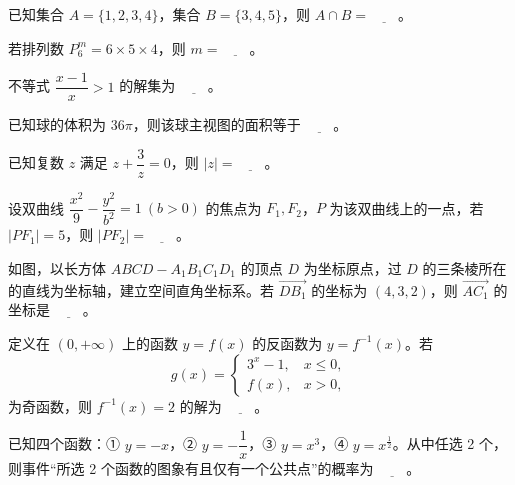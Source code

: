 \begin{question}
已知集合 $A=\{1,2,3,4\}$，集合 $B=\{3,4,5\}$，则 $A\cap B=\underline{\qquad}$。

\end{question}
\begin{question}
若排列数 $P_6^m=6\times5\times4$，则 $m=\underline{\qquad}$。

\end{question}
\begin{question}
不等式 $\dfrac{x-1}{x}>1$ 的解集为 $\underline{\qquad}$。

\end{question}
\begin{question}
已知球的体积为 $36\pi$，则该球主视图的面积等于 $\underline{\qquad}$。

\end{question}
\begin{question}
已知复数 $z$ 满足 $z+\dfrac{3}{z}=0$，则 $|z|=\underline{\qquad}$。

\end{question}
\begin{question}
设双曲线 $\dfrac{x^2}{9}-\dfrac{y^2}{b^2}=1\ (b>0)$ 的焦点为 $F_1,F_2$，$P$ 为该双曲线上的一点，若 $|PF_1|=5$，则 $|PF_2|=\underline{\qquad}$。

\Needspace{0.4\textheight}
\end{question}
\begin{question}
如图，以长方体 $ABCD-A_1B_1C_1D_1$ 的顶点 $D$ 为坐标原点，过 $D$ 的三条棱所在的直线为坐标轴，建立空间直角坐标系。若 $\overrightarrow{DB_1}$ 的坐标为 $(4,3,2)$，则 $\overrightarrow{AC_1}$ 的坐标是 $\underline{\qquad}$。
\nopagebreak[4]
\begin{center}\end{center}
\nopagebreak[4]
\end{question}
\begin{question}
定义在 $(0,+\infty)$ 上的函数 $y=f(x)$ 的反函数为 $y=f^{-1}(x)$。若
\nopagebreak[4]
\[
g(x)=
\begin{cases}
3^x-1,&x\leqslant0,\\
f(x),&x>0,
\end{cases}
\]
为奇函数，则 $f^{-1}(x)=2$ 的解为 $\underline{\qquad}$。

\end{question}
\begin{question}
已知四个函数：① $y=-x$，② $y=-\dfrac1x$，③ $y=x^3$，④ $y=x^{\frac12}$。从中任选 2 个，则事件“所选 2 个函数的图象有且仅有一个公共点”的概率为 $\underline{\qquad}$。

\end{question}
